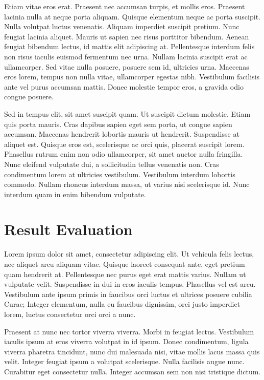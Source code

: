 \documentclass[12pt,oneside,a4paper,parskip]{scrbook}
\begin{document}
Etiam vitae eros erat. Praesent nec accumsan turpis, et mollis eros. Praesent lacinia nulla at neque porta aliquam. Quisque elementum neque ac porta suscipit. Nulla volutpat luctus venenatis. Aliquam imperdiet suscipit pretium. Nunc feugiat lacinia aliquet. Mauris ut sapien nec risus porttitor bibendum. Aenean feugiat bibendum lectus, id mattis elit adipiscing at. Pellentesque interdum felis non risus iaculis euismod fermentum nec urna. Nullam lacinia suscipit erat ac ullamcorper. Sed vitae nulla posuere, posuere sem id, ultricies urna. Maecenas eros lorem, tempus non nulla vitae, ullamcorper egestas nibh. Vestibulum facilisis ante vel purus accumsan mattis. Donec molestie tempor eros, a gravida odio congue posuere.

Sed in tempus elit, sit amet suscipit quam. Ut suscipit dictum molestie. Etiam quis porta mauris. Cras dapibus sapien eget sem porta, ut congue sapien accumsan. Maecenas hendrerit lobortis mauris ut hendrerit. Suspendisse at aliquet est. Quisque eros est, scelerisque ac orci quis, placerat suscipit lorem. Phasellus rutrum enim non odio ullamcorper, sit amet auctor nulla fringilla. Nunc eleifend vulputate dui, a sollicitudin tellus venenatis non. Cras condimentum lorem at ultricies vestibulum. Vestibulum interdum lobortis commodo. Nullam rhoncus interdum massa, ut varius nisi scelerisque id. Nunc interdum quam in enim bibendum vulputate.


\chapter{Result Evaluation}

Lorem ipsum dolor sit amet, consectetur adipiscing elit. Ut vehicula felis lectus, nec aliquet arcu aliquam vitae. Quisque laoreet consequat ante, eget pretium quam hendrerit at. Pellentesque nec purus eget erat mattis varius. Nullam ut vulputate velit. Suspendisse in dui in eros iaculis tempus. Phasellus vel est arcu. Vestibulum ante ipsum primis in faucibus orci luctus et ultrices posuere cubilia Curae; Integer elementum, nulla eu faucibus dignissim, orci justo imperdiet lorem, luctus consectetur orci orci a nunc.

Praesent at nunc nec tortor viverra viverra. Morbi in feugiat lectus. Vestibulum iaculis ipsum at eros viverra volutpat in id ipsum. Donec condimentum, ligula viverra pharetra tincidunt, nunc dui malesuada nisi, vitae mollis lacus massa quis velit. Integer feugiat ipsum a volutpat scelerisque. Nulla facilisis augue nunc. Curabitur eget consectetur nulla. Integer accumsan sem non nisi tristique dictum.
\end{document}

